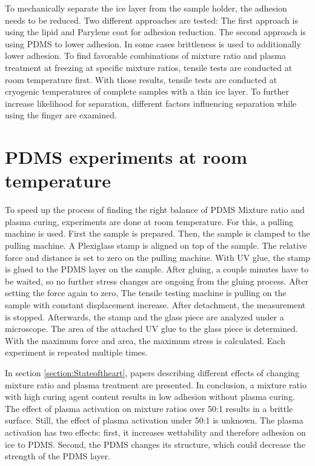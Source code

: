 
To mechanically separate the ice layer from the sample holder, the adhesion needs to be reduced. Two different approaches are tested: The first approach is using the lipid and Parylene coat for adhesion reduction. The second approach is using PDMS to lower adhesion. In some cases brittleness is used to additionally lower adhesion. To find favorable combinations of mixture ratio and plasma treatment at freezing at specific mixture ratios, tensile tests are conducted at room temperature first. With those results, tensile tests are conducted at cryogenic temperatures of complete samples with a thin ice layer. To further increase likelihood for separation, different factors influencing separation while using the finger are examined.

\section{PDMS experiments at room temperature}

To speed up the process of finding the right balance of PDMS Mixture ratio and plasma curing, experiments are done at room temperature. For this, a pulling machine is used. First the sample is prepared. Then, the sample is clamped to the pulling machine. A Plexiglass stamp is aligned on top of the sample. The relative force and distance is set to zero on the pulling machine. With UV glue, the stamp is glued to the PDMS layer on the sample. After gluing, a couple minutes have to be waited, so no further stress changes are ongoing from the gluing process. After setting the force again to zero, The tensile testing machine is pulling on the sample with constant displacement increase. After detachment, the measurement is stopped. Afterwards, the stamp and the glass piece are analyzed under a microscope. The area of the attached UV glue to the glass piece is determined. With the maximum force and area, the maximum stress is calculated. Each experiment is repeated multiple times.

In section \ref{section:Stateoftheart}, papers describing different effects of changing mixture ratio and plasma treatment are presented. In conclusion, a mixture ratio with high curing agent content results in low adhesion without plasma curing. The effect of plasma activation on mixture ratios over 50:1 results in a brittle surface. Still, the effect of plasma activation under 50:1 is unknown. The plasma activation has two effects: first, it increases wettability and therefore adhesion on ice to PDMS. Second, the PDMS changes its structure, which could decrease the strength of the PDMS layer.

